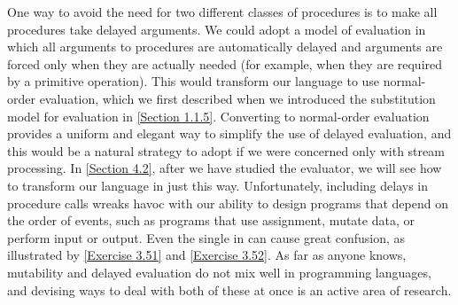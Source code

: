 One way to avoid the need for two different classes of procedures is to make all procedures take delayed arguments.
We could adopt a model of evaluation in which all arguments to procedures are automatically delayed and arguments are forced only when they are actually needed (for example, when they are required by a primitive operation).
This would transform our language to use normal-order evaluation, which we first described when we introduced the substitution model for evaluation in \cref{Section 1.1.5}.
Converting to normal-order evaluation provides a uniform and elegant way to simplify the use of delayed evaluation, and this would be a natural strategy to adopt if we were concerned only with stream processing.
In \cref{Section 4.2}, after we have studied the evaluator, we will see how to transform our language in just this way.
Unfortunately, including delays in procedure calls wreaks havoc with our ability to design programs that depend on the order of events, such as programs that use assignment, mutate data, or perform input or output.
Even the single  in  can cause great confusion, as illustrated by \cref{Exercise 3.51} and \cref{Exercise 3.52}.
As far as anyone knows, mutability and delayed evaluation do not mix well in programming languages, and devising ways to deal with both of these at once is an active area of research.
